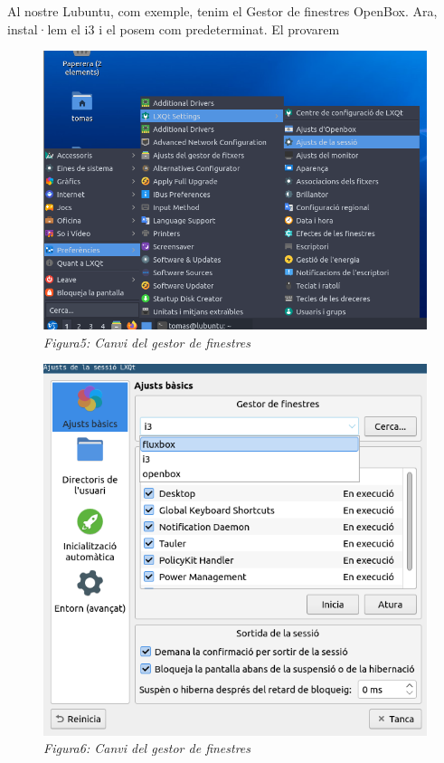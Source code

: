 \documentclass[
  a4paper,
]{article}
\begin{document}
Al nostre Lubuntu, com exemple, tenim el Gestor de finestres OpenBox.
Ara, instal·lem el i3 i el posem com predeterminat. El provarem

\begin{figure}
\centering
\includegraphics{png/AjustsGestorFinestres0.png}
\caption{\emph{Figura5: Canvi del gestor de finestres}}
\end{figure}

\begin{figure}
\centering
\includegraphics{png/AjustsGestorFinestres1.png}
\caption{\emph{Figura6: Canvi del gestor de finestres}}
\end{figure}
\end{document}
